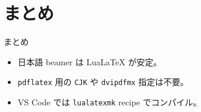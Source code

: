 \documentclass[xcolor=svgnames,aspectratio=169]{beamer}
\begin{document}
\section{まとめ}

\begin{frame}{まとめ}
  \begin{itemize}
    \item 日本語 beamer は \alert{LuaLaTeX} が安定。
    \item \texttt{pdflatex} 用の \texttt{CJK} や \texttt{dvipdfmx} 指定は不要。
    \item VS Code では \texttt{lualatexmk} recipe でコンパイル。
  \end{itemize}
\end{frame}
\end{document}
